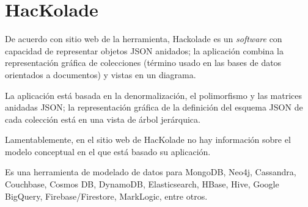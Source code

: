 \section{HacKolade}
De acuerdo con sitio web de la herramienta\cite{hackolade_hackolade_2020}, Hackolade es un \textit{software} con capacidad de representar objetos JSON anidados; la aplicación combina la representación gráfica de colecciones (término usado en las bases de datos orientados a documentos) y vistas en un diagrama.


La aplicación está basada en la denormalización, el polimorfismo y las matrices anidadas JSON; la representación gráfica de la definición del esquema JSON de cada colección está en una vista de árbol jerárquica. 


Lamentablemente, en el sitio web de HacKolade no hay información sobre el modelo conceptual en el que está basado su aplicación.


Es una herramienta de modelado de datos para MongoDB, Neo4j, Cassandra, Couchbase, Cosmos DB, DynamoDB, Elasticsearch, HBase, Hive, Google BigQuery, Firebase/Firestore, MarkLogic, entre otros.